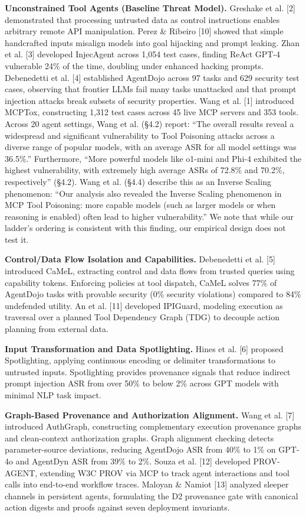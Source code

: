 \documentclass[11pt,letterpaper]{article}
\begin{document}
\textbf{Unconstrained Tool Agents (Baseline Threat Model).} Greshake et al. [2] demonstrated that processing untrusted data as control instructions enables arbitrary remote API manipulation. Perez \& Ribeiro [10] showed that simple handcrafted inputs misalign models into goal hijacking and prompt leaking. Zhan et al. [3] developed InjecAgent across 1,054 test cases, finding ReAct GPT-4 vulnerable 24\% of the time, doubling under enhanced hacking prompts. Debenedetti et al. [4] established AgentDojo across 97 tasks and 629 security test cases, observing that frontier LLMs fail many tasks unattacked and that prompt injection attacks break subsets of security properties. Wang et al. [1] introduced MCPTox, constructing 1,312 test cases across 45 live MCP servers and 353 tools. Across 20 agent settings, Wang et al. (§4.2) report: ``The overall results reveal a widespread and significant vulnerability to Tool Poisoning attacks across a diverse range of popular models, with an average ASR for all model settings was 36.5\%.'' Furthermore, ``More powerful models like o1-mini and Phi-4 exhibited the highest vulnerability, with extremely high average ASRs of 72.8\% and 70.2\%, respectively'' (§4.2). Wang et al. (§4.4) describe this as an Inverse Scaling phenomenon: ``Our analysis also revealed the Inverse Scaling phenomenon in MCP Tool Poisoning: more capable models (such as larger models or when reasoning is enabled) often lead to higher vulnerability.'' We note that while our ladder's ordering is consistent with this finding, our empirical design does not test it.

\textbf{Control/Data Flow Isolation and Capabilities.} Debenedetti et al. [5] introduced CaMeL, extracting control and data flows from trusted queries using capability tokens. Enforcing policies at tool dispatch, CaMeL solves 77\% of AgentDojo tasks with provable security (0\% security violations) compared to 84\% undefended utility. An et al. [11] developed IPIGuard, modeling execution as traversal over a planned Tool Dependency Graph (TDG) to decouple action planning from external data.

\textbf{Input Transformation and Data Spotlighting.} Hines et al. [6] proposed Spotlighting, applying continuous encoding or delimiter transformations to untrusted inputs. Spotlighting provides provenance signals that reduce indirect prompt injection ASR from over 50\% to below 2\% across GPT models with minimal NLP task impact.

\textbf{Graph-Based Provenance and Authorization Alignment.} Wang et al. [7] introduced AuthGraph, constructing complementary execution provenance graphs and clean-context authorization graphs. Graph alignment checking detects parameter-source deviations, reducing AgentDojo ASR from 40\% to 1\% on GPT-4o and AgentDyn ASR from 39\% to 2\%. Souza et al. [12] developed PROV-AGENT, extending W3C PROV via MCP to track agent interactions and tool calls into end-to-end workflow traces. Maloyan \& Namiot [13] analyzed sleeper channels in persistent agents, formulating the D2 provenance gate with canonical action digests and proofs against seven deployment invariants.
\end{document}
